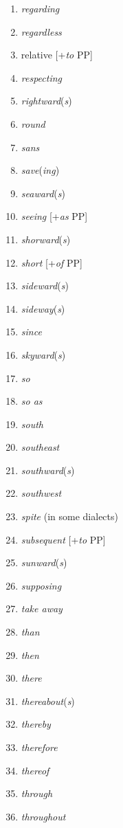 \begin{multicols}{3}
\begin{enumerate}[noitemsep]
    \item \textit{regarding}
    \item \textit{regardless}
    \item relative [+\textit{to} PP]
    \item \textit{respecting}
    \item \textit{rightward}(\textit{s})
    \item \textit{round}
    \item \textit{sans}
    \item \textit{save}(\textit{ing})
    \item \textit{seaward}(\textit{s})
    \item \textit{seeing} [+\textit{as} PP]
    \item \textit{shorward}(\textit{s})
    \item \textit{short} [+\textit{of} PP]
    \item \textit{sideward}(\textit{s})
    \item \textit{sideway}(\textit{s})
    \item \textit{since}
    \item \textit{skyward}(\textit{s})
    \item \textit{so}
    \item \textit{so as}
    \item \textit{south}
    \item \textit{southeast}
    \item \textit{southward}(\textit{s})
    \item \textit{southwest}
    \item \textit{spite} (in some dialects)
    \item \textit{subsequent} [+\textit{to} PP]
    \item \textit{sunward}(\textit{s})
    \item \textit{supposing}
    \item \textit{take away}
    \item \textit{than}
    \item \textit{then}
    \item \textit{there}
    \item \textit{thereabout}(\textit{s})
    \item \textit{thereby}
    \item \textit{therefore}
    \item \textit{thereof}
    \item \textit{through}
    \item \textit{throughout}

\end{enumerate}
\end{multicols}

